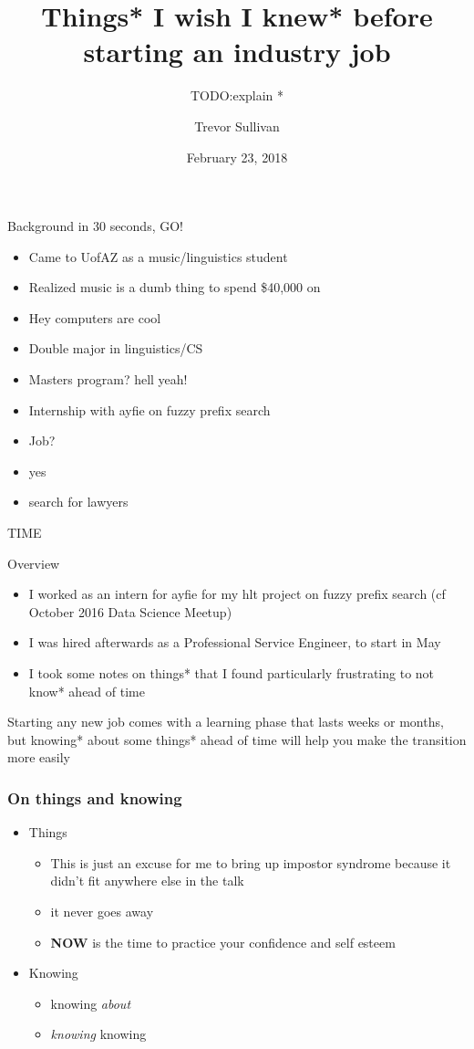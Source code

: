 \documentclass[10pt]{beamer}
\title{Things* I wish I knew* before starting an industry job}
\subtitle{TODO:explain *}
\date{February 23, 2018}
\author{Trevor Sullivan}
\begin{document}
\maketitle

\begin{frame}{Background in 30 seconds, GO!}
\pause
    \begin{itemize}[<+->]
    	\item Came to UofAZ as a music/linguistics student
    	\item Realized music is a dumb thing to spend \$40,000 on
    	\item Hey computers are cool
    	\item Double major in linguistics/CS
    	\item Masters program? hell yeah!
    	\item Internship with ayfie on fuzzy prefix search
    	\item Job?
    	\item yes
    	\item search for lawyers
    \end{itemize}
\pause
TIME

\end{frame}

\begin{frame}{Overview}
\pause
\begin{itemize}[<+->]
	\item I worked as an intern for ayfie for my hlt project on fuzzy prefix search
	(cf October 2016 Data Science Meetup)
	\item I was hired afterwards as a Professional Service Engineer, to start in May
	\item I took some notes on things* that I found particularly frustrating to not know* ahead of time
\end{itemize}
\pause
Starting any new job comes with a learning phase that lasts weeks or months, but knowing* about some things* ahead of time will help you make the transition more easily

\end{frame}

\begin{frame}
	\frametitle{On things and knowing}

	\begin{itemize}[<+->]
		\item Things
		\begin{itemize}[<+->]
			\item This is just an excuse for me to bring up \alert{impostor syndrome} because it didn't fit anywhere else in the talk
			\item it never goes away
			\item \textbf{NOW} is the time to practice your confidence and self esteem
		\end{itemize}
		\item Knowing
		\begin{itemize}[<+->]
			\item knowing \textit{about}
			\item \textit{knowing} knowing
		\end{itemize}
	\end{itemize}
\end{frame}
\end{document}
